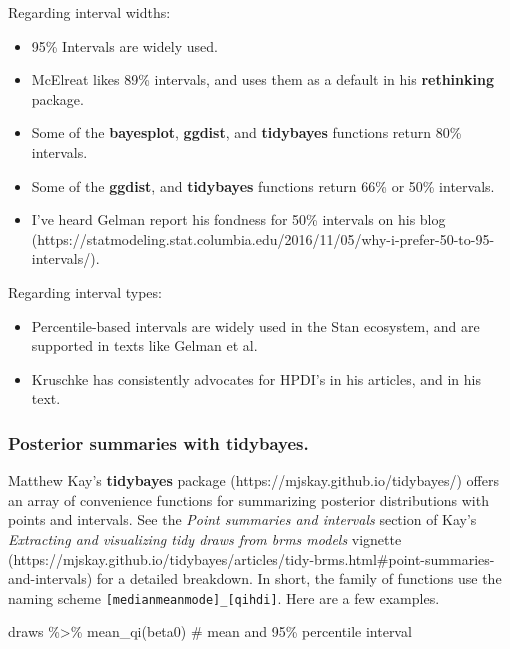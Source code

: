 \documentclass[
  letterpaper,
  DIV=11,
  numbers=noendperiod]{scrartcl}
\newenvironment{Shaded}{\begin{snugshade}}{\end{snugshade}}
\newcommand{\CommentTok}[1]{\textcolor[rgb]{0.37,0.37,0.37}{#1}}
\newcommand{\FunctionTok}[1]{\textcolor[rgb]{0.28,0.35,0.67}{#1}}
\newcommand{\NormalTok}[1]{\textcolor[rgb]{0.00,0.23,0.31}{#1}}
\newcommand{\SpecialCharTok}[1]{\textcolor[rgb]{0.37,0.37,0.37}{#1}}
\providecommand{\tightlist}{%
  \setlength{\itemsep}{0pt}\setlength{\parskip}{0pt}}\usepackage{longtable,booktabs,array}
\begin{document}
Regarding interval widths:

\begin{itemize}
\tightlist
\item
  95\% Intervals are widely used.
\item
  McElreat likes 89\% intervals, and uses them as a default in his
  \textbf{rethinking} package.
\item
  Some of the \textbf{bayesplot}, \textbf{ggdist}, and
  \textbf{tidybayes} functions return 80\% intervals.
\item
  Some of the \textbf{ggdist}, and \textbf{tidybayes} functions return
  66\% or 50\% intervals.
\item
  I've heard Gelman report his fondness for 50\% intervals on his blog
  (https://statmodeling.stat.columbia.edu/2016/11/05/why-i-prefer-50-to-95-intervals/).
\end{itemize}

Regarding interval types:

\begin{itemize}
\tightlist
\item
  Percentile-based intervals are widely used in the Stan ecosystem, and
  are supported in texts like Gelman et al.
\item
  Kruschke has consistently advocates for HPDI's in his articles, and in
  his text.
\end{itemize}

\subsubsection{\texorpdfstring{Posterior summaries with
\textbf{tidybayes}.}{Posterior summaries with tidybayes.}}\label{posterior-summaries-with-tidybayes.}

Matthew Kay's \textbf{tidybayes} package
(https://mjskay.github.io/tidybayes/) offers an array of convenience
functions for summarizing posterior distributions with points and
intervals. See the \emph{Point summaries and intervals} section of Kay's
\emph{Extracting and visualizing tidy draws from brms models} vignette
(https://mjskay.github.io/tidybayes/articles/tidy-brms.html\#point-summaries-and-intervals)
for a detailed breakdown. In short, the family of functions use the
naming scheme
\texttt{{[}median\textbar{}mean\textbar{}mode{]}\_{[}qi\textbar{}hdi{]}}.
Here are a few examples.

\begin{Shaded}
\begin{Highlighting}[]
\NormalTok{draws }\SpecialCharTok{\%\textgreater{}\%} \FunctionTok{mean\_qi}\NormalTok{(beta0)                        }\CommentTok{\# mean and 95\% percentile interval}
\end{Highlighting}
\end{Shaded}
\end{document}
